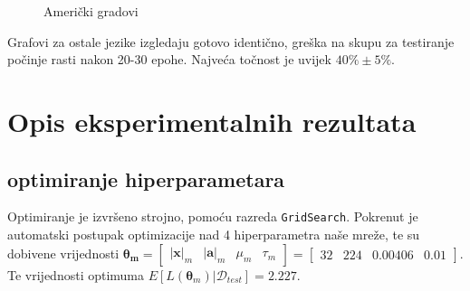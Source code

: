\documentclass[conference]{IEEEtran}
\begin{document}
\begin{figure}[H]
\centering
{}
\caption{Američki gradovi}
\end{figure}
Grafovi za ostale jezike izgledaju gotovo identično, greška na skupu za testiranje počinje rasti nakon 20-30 epohe. Najveća točnost je uvijek $40\% \pm 5\%$.

\section{Opis eksperimentalnih rezultata} 
\subsection{optimiranje hiperparametara}
Optimiranje je izvršeno strojno, pomoću razreda \texttt{GridSearch}.
Pokrenut je automatski postupak optimizacije nad 4 hiperparametra naše mreže, te su dobivene vrijednosti $\mathbf{\boldsymbol{\theta}_m} = \begin{bmatrix} \lvert \mathbf{x} \rvert_m & \lvert \mathbf{a} \rvert_m & \mu_m & \tau_m \end{bmatrix} = \begin{bmatrix} 32 & 224 & 0.00406 & 0.01 \end{bmatrix}$.
Te vrijednosti optimuma $E[L(\mathbf{\boldsymbol{\theta}}_m) | \mathcal{D}_{test}] = 2.227$.
\end{document}
